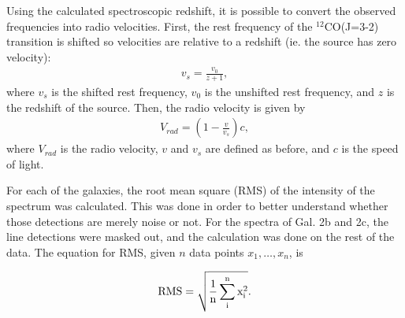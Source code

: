 \documentclass[11pt]{article}
\begin{document}
Using the calculated spectroscopic redshift, it is possible to convert the observed frequencies into radio velocities. First, the rest frequency of the $^{12}$CO(J=3-2) transition is shifted so velocities are relative to a redshift (ie. the source has zero velocity):
\begin{align*}
	v_s = \frac{v_0}{z+1},
\end{align*}
where $v_s$ is the shifted rest frequency, $v_0$ is the unshifted rest frequency, and $z$ is the redshift of the source. Then, the radio velocity is given by 
\begin{align*}
	V_{rad} = (1 - \frac{v}{v_s})c,
\end{align*}
where $V_{rad}$ is the radio velocity, $v$ and $v_s$ are defined as before, and $c$ is the speed of light. 

For each of the galaxies, the root mean square (RMS) of the intensity of the spectrum was calculated. This was done in order to better understand whether those detections are merely noise or not. For the spectra of Gal. 2b and 2c, the line detections were masked out, and the calculation was done on the rest of the data. The equation for RMS, given $n$ data points $x_1, \ldots, x_n$, is 

\begin{align*}
	\rm{RMS} = \sqrt{\frac{1}{n}\sum_i^nx_i^2}.
\end{align*}
\end{document}
